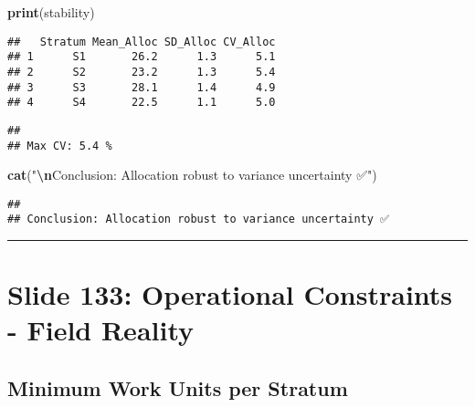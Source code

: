 \documentclass[
]{article}
\newenvironment{Shaded}{\begin{snugshade}}{\end{snugshade}}
\newcommand{\FunctionTok}[1]{\textcolor[rgb]{0.13,0.29,0.53}{\textbf{#1}}}
\newcommand{\NormalTok}[1]{#1}
\newcommand{\SpecialCharTok}[1]{\textcolor[rgb]{0.81,0.36,0.00}{\textbf{#1}}}
\newcommand{\StringTok}[1]{\textcolor[rgb]{0.31,0.60,0.02}{#1}}
\begin{document}
\begin{Shaded}
\begin{Highlighting}[]
\FunctionTok{print}\NormalTok{(stability)}
\end{Highlighting}
\end{Shaded}

\begin{verbatim}
##   Stratum Mean_Alloc SD_Alloc CV_Alloc
## 1      S1       26.2      1.3      5.1
## 2      S2       23.2      1.3      5.4
## 3      S3       28.1      1.4      4.9
## 4      S4       22.5      1.1      5.0
\end{verbatim}

\begin{Shaded}
\end{Shaded}

\begin{verbatim}
## 
## Max CV: 5.4 %
\end{verbatim}

\begin{Shaded}
\begin{Highlighting}[]
\FunctionTok{cat}\NormalTok{(}\StringTok{"}\SpecialCharTok{\textbackslash{}n}\StringTok{Conclusion: Allocation robust to variance uncertainty ✅"}\NormalTok{)}
\end{Highlighting}
\end{Shaded}

\begin{verbatim}
## 
## Conclusion: Allocation robust to variance uncertainty ✅
\end{verbatim}

\begin{center}\rule{0.5\linewidth}{0.5pt}\end{center}

\section{Slide 133: Operational Constraints - Field
Reality}\label{slide-133-operational-constraints---field-reality}

\subsection{Minimum Work Units per
Stratum}\label{minimum-work-units-per-stratum}
\end{document}

